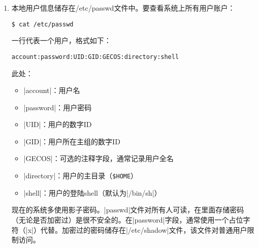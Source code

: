 \documentclass[cs4size,a4paper,nofonts]{ctexart}
\begin{document}
\begin{enumerate}

\item 本地用户信息储存在/etc/passwd文件中。要查看系统上所有用户账户：
\begin{Verbatim}
$ cat /etc/passwd
\end{Verbatim}

一行代表一个用户，格式如下：
\begin{Verbatim}
account:password:UID:GID:GECOS:directory:shell
\end{Verbatim}

此处：
\begin{itemize}
\item |account|：用户名
\item |password|：用户密码
\item |UID|：用户的数字ID
\item |GID|：用户所在主组的数字ID
\item |GECOS|：可选的注释字段，通常记录用户全名
\item |directory|：用户的主目录（{\tt\$HOME}）
\item |shell|：用户的登陆shell（默认为|/bin/sh|）
\end{itemize}

现在的系统多使用影子密码。|passwd|文件对所有人可读，在里面存储密码（无论是否加密过）是很不安全的。在|password|字段，通常使用一个占位字符（|x|）代替。加密过的密码储存在|/etc/shadow|文件，该文件对普通用户限制访问。

\begin{figure}[htp]
\end{figure}



\begin{figure}[htp]
\end{figure}



\begin{figure}[htp]
\end{figure}



\begin{figure}[htp]
\end{figure}



\begin{figure}[htp]
\end{figure}




\end{enumerate}
\end{document}

